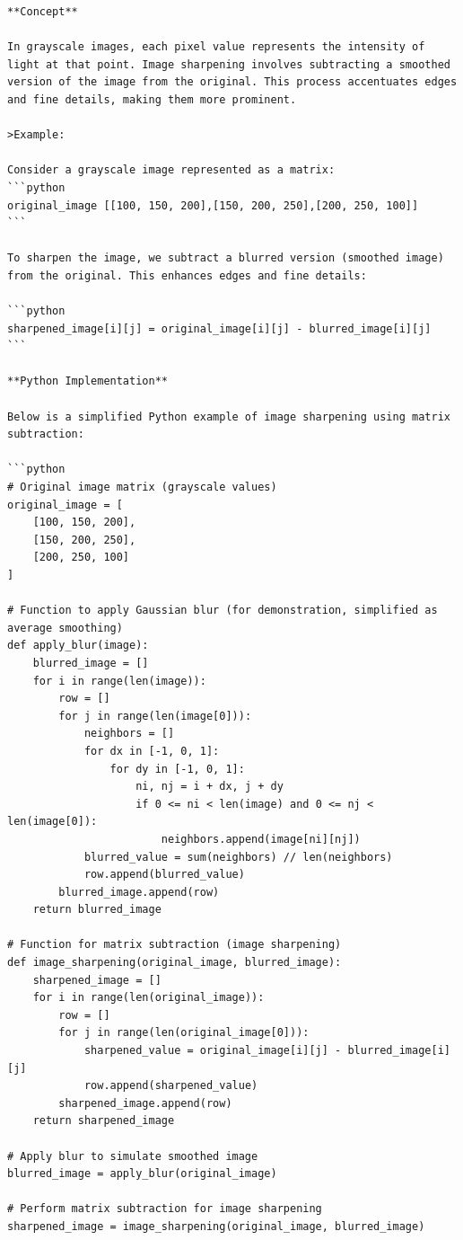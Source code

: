 \documentclass[
  letterpaper,
  DIV=11,
  numbers=noendperiod]{scrreprt}
\theoremstyle{plain}
\theoremstyle{definition}
\theoremstyle{remark}
\begin{document}
\begin{verbatim}
**Concept**

In grayscale images, each pixel value represents the intensity of light at that point. Image sharpening involves subtracting a smoothed version of the image from the original. This process accentuates edges and fine details, making them more prominent.

>Example:

Consider a grayscale image represented as a matrix:
```python
original_image [[100, 150, 200],[150, 200, 250],[200, 250, 100]]
```

To sharpen the image, we subtract a blurred version (smoothed image) from the original. This enhances edges and fine details:

```python
sharpened_image[i][j] = original_image[i][j] - blurred_image[i][j]
```

**Python Implementation**

Below is a simplified Python example of image sharpening using matrix subtraction:

```python
# Original image matrix (grayscale values)
original_image = [
    [100, 150, 200],
    [150, 200, 250],
    [200, 250, 100]
]

# Function to apply Gaussian blur (for demonstration, simplified as average smoothing)
def apply_blur(image):
    blurred_image = []
    for i in range(len(image)):
        row = []
        for j in range(len(image[0])):
            neighbors = []
            for dx in [-1, 0, 1]:
                for dy in [-1, 0, 1]:
                    ni, nj = i + dx, j + dy
                    if 0 <= ni < len(image) and 0 <= nj < len(image[0]):
                        neighbors.append(image[ni][nj])
            blurred_value = sum(neighbors) // len(neighbors)
            row.append(blurred_value)
        blurred_image.append(row)
    return blurred_image

# Function for matrix subtraction (image sharpening)
def image_sharpening(original_image, blurred_image):
    sharpened_image = []
    for i in range(len(original_image)):
        row = []
        for j in range(len(original_image[0])):
            sharpened_value = original_image[i][j] - blurred_image[i][j]
            row.append(sharpened_value)
        sharpened_image.append(row)
    return sharpened_image

# Apply blur to simulate smoothed image
blurred_image = apply_blur(original_image)

# Perform matrix subtraction for image sharpening
sharpened_image = image_sharpening(original_image, blurred_image)


\end{verbatim}
\end{document}

